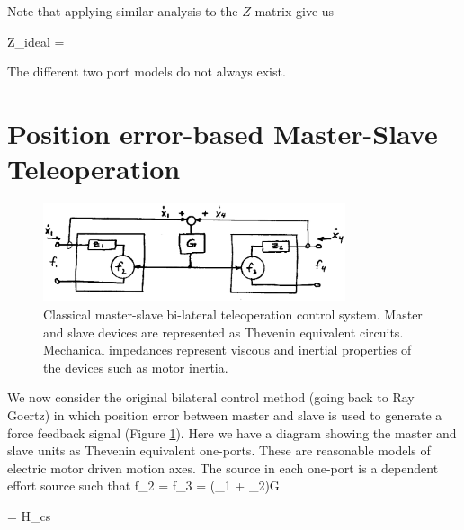 Note that applying similar analysis to the $Z$ matrix give us

\bq
Z_{ideal} = 
\eq

The different two port models do not always exist.

\section{Position error-based Master-Slave Teleoperation}

%
\begin{figure}[h]	%
\centering \includegraphics[width=3.5in]{figs14/00313.eps}
\caption{Classical master-slave bi-lateral teleoperation control system.  Master and slave devices are represented as Thevenin equivalent circuits.  Mechanical impedances represent viscous and inertial properties of the devices such as motor inertia.}\label{ClassicalMasterSlave}	%
\end{figure}	%

We now consider the original bilateral control method (going back to Ray Goertz) in which position error between master and slave is used to generate a force feedback signal (Figure \ref{ClassicalMasterSlave}).  Here we have a diagram showing the master and slave units as Thevenin equivalent one-ports.  These are reasonable models of electric motor driven motion axes.  The source in each one-port is a dependent effort source such that
\bq
f_2 = f_3 = (_1 + _2)G
\eq


\bq\label{HMatrixDef2}
=
H_{cs}  
\eq

